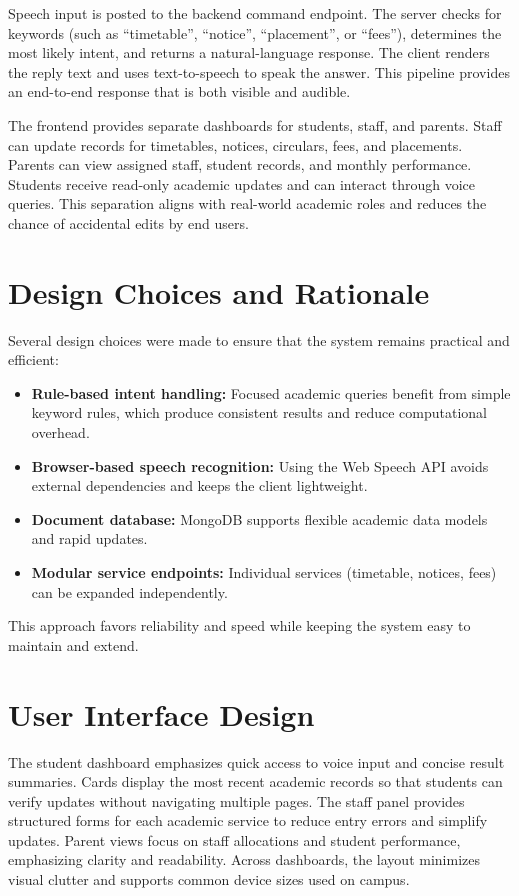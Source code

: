 ﻿\documentclass[conference]{IEEEtran}
\begin{document}
Speech input is posted to the backend command endpoint. The server checks for keywords (such as ``timetable'', ``notice'', ``placement'', or ``fees''), determines the most likely intent, and returns a natural-language response. The client renders the reply text and uses text-to-speech to speak the answer. This pipeline provides an end-to-end response that is both visible and audible.

The frontend provides separate dashboards for students, staff, and parents. Staff can update records for timetables, notices, circulars, fees, and placements. Parents can view assigned staff, student records, and monthly performance. Students receive read-only academic updates and can interact through voice queries. This separation aligns with real-world academic roles and reduces the chance of accidental edits by end users.

\section{Design Choices and Rationale}
Several design choices were made to ensure that the system remains practical and efficient:
\begin{itemize}[leftmargin=*]
\item \textbf{Rule-based intent handling:} Focused academic queries benefit from simple keyword rules, which produce consistent results and reduce computational overhead.
\item \textbf{Browser-based speech recognition:} Using the Web Speech API avoids external dependencies and keeps the client lightweight.
\item \textbf{Document database:} MongoDB supports flexible academic data models and rapid updates.
\item \textbf{Modular service endpoints:} Individual services (timetable, notices, fees) can be expanded independently.
\end{itemize}

This approach favors reliability and speed while keeping the system easy to maintain and extend.

\section{User Interface Design}
The student dashboard emphasizes quick access to voice input and concise result summaries. Cards display the most recent academic records so that students can verify updates without navigating multiple pages. The staff panel provides structured forms for each academic service to reduce entry errors and simplify updates. Parent views focus on staff allocations and student performance, emphasizing clarity and readability. Across dashboards, the layout minimizes visual clutter and supports common device sizes used on campus.
\end{document}
